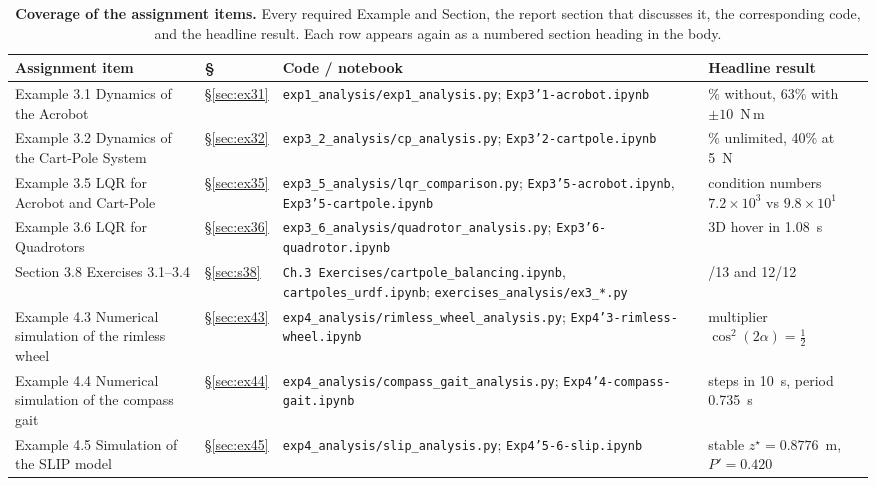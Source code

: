 \documentclass[11pt]{report}
\begin{document}
\begin{table}[!htbp]
\centering
\footnotesize
\caption{\textbf{Coverage of the assignment items.} Every required Example and Section,
the report section that discusses it, the corresponding code, and the headline
result.  Each row appears again as a numbered section heading in the body.}
\label{tab:coverage}
\setlength{\tabcolsep}{3pt}
\begin{tabular}{@{}>{\raggedright\arraybackslash}p{}>{\raggedright\arraybackslash}p{}>{\raggedright\arraybackslash}p{}>{\raggedright\arraybackslash}p{}@{}}
\toprule
Assignment item & \S & Code / notebook & Headline result \\
\midrule
Example 3.1 Dynamics of the Acrobot
  & \S\ref{sec:ex31}
  & \texttt{exp1\_analysis/exp1\_analysis.py};
    \texttt{Exp3'1-acrobot.ipynb}
  & 98\% without, 63\% with \(\pm10\)~N\,m \\
Example 3.2 Dynamics of the Cart-Pole System
  & \S\ref{sec:ex32}
  & \texttt{exp3\_2\_analysis/cp\_analysis.py};
    \texttt{Exp3'2-cartpole.ipynb}
  & 100\% unlimited, 40\% at 5~N \\
Example 3.5 LQR for Acrobot and Cart-Pole
  & \S\ref{sec:ex35}
  & \texttt{exp3\_5\_analysis/lqr\_comparison.py};
    \texttt{Exp3'5-acrobot.ipynb}, \texttt{Exp3'5-cartpole.ipynb}
  & condition numbers \(7.2\times10^3\) vs \(9.8\times10^1\) \\
Example 3.6 LQR for Quadrotors
  & \S\ref{sec:ex36}
  & \texttt{exp3\_6\_analysis/quadrotor\_analysis.py};
    \texttt{Exp3'6-quadrotor.ipynb}
  & 3D hover in 1.08~s \\
Section 3.8 Exercises 3.1--3.4
  & \S\ref{sec:s38}
  & \texttt{Ch.3 Exercises/cartpole\_balancing.ipynb},
    \texttt{cartpoles\_urdf.ipynb};
    \texttt{exercises\_analysis/ex3\_*.py}
  & 13/13 and 12/12 \\
\midrule
Example 4.3 Numerical simulation of the rimless wheel
  & \S\ref{sec:ex43}
  & \texttt{exp4\_analysis/rimless\_wheel\_analysis.py};
    \texttt{Exp4'3-rimless-wheel.ipynb}
  & multiplier \(\cos^2(2\alpha)=\tfrac12\) \\
Example 4.4 Numerical simulation of the compass gait
  & \S\ref{sec:ex44}
  & \texttt{exp4\_analysis/compass\_gait\_analysis.py};
    \texttt{Exp4'4-compass-gait.ipynb}
  & 14 steps in 10~s, period 0.735~s \\
Example 4.5 Simulation of the SLIP model
  & \S\ref{sec:ex45}
  & \texttt{exp4\_analysis/slip\_analysis.py};
    \texttt{Exp4'5-6-slip.ipynb}
  & stable \(z^\star=0.8776\)~m, \(P'=0.420\) \\

\end{tabular}
\end{table}
\end{document}
